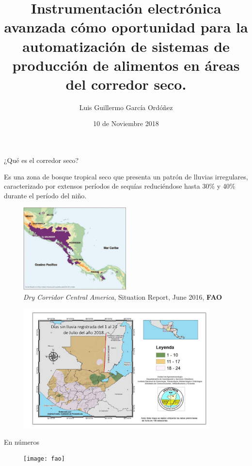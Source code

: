 \documentclass[]{beamer}
\title{Instrumentación electrónica avanzada cómo oportunidad para la automatización de sistemas de producción de alimentos en áreas del corredor seco.}
\author{Luis Guillermo García Ordóñez}
\date{10 de Noviembre 2018}
\begin{document}
\maketitle

\begin{frame}{¿Qué es el corredor seco?}

Es una zona de bosque tropical seco que presenta un patrón de lluvias irregulares, caracterizado por extensos períodos de sequías reduciéndose hasta 30\% y 40\% durante el período del niño. 
\begin{figure}
    \centering
    \includegraphics[width=0.5\textwidth]{Docs/Mapa_CS}
    \caption{\small \textit{Dry Corridor Central America}, Situation Report, June 2016, \textbf{FAO}}
    \label{fig:my_label}
\end{figure}

\end{frame}

\begin{frame}{}
\begin{figure}
    \centering
    \includegraphics[width=0.9\textwidth]{Docs/diassinlluvia.jpg}
    \label{fig:my_label}
\end{figure}    
\end{frame}

\begin{frame}{En números}
    \begin{figure}
        \centering
        \texttt{[image: fao]}
        \caption{}
        \label{fig:my_label}
    \end{figure}
\end{frame}
\end{document}
